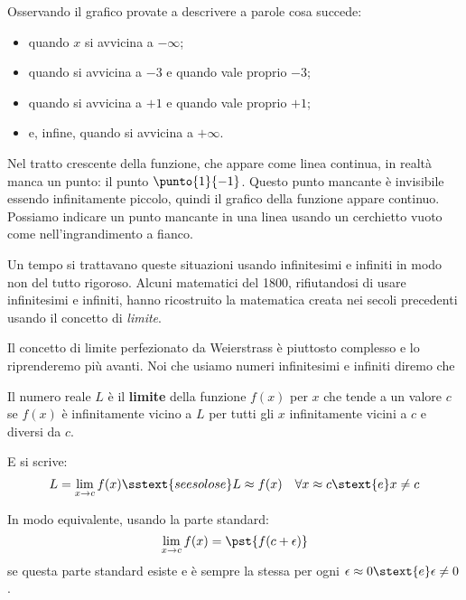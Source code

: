 Osservando il grafico provate a descrivere a parole cosa succede:

\begin{minipage}{.64\textwidth}
\begin{itemize} [nosep]
 \item quando \(x\) si avvicina a \(-\infty\); 
 \item quando si avvicina a \(-3\) e quando vale proprio \(-3\);
 \item quando si avvicina a \(+1\) e quando vale proprio \(+1\); 
 \item e, infine, quando si avvicina a \(+\infty\).
\end{itemize}

\begin{osservazione}
Nel tratto crescente della funzione, che appare come linea continua, in 
realtà manca un punto: il punto \(\punto{1}{-1}\). 
Questo punto mancante è invisibile essendo infinitamente piccolo, quindi il 
grafico della funzione appare continuo. 
Possiamo indicare un punto mancante in una linea usando un cerchietto vuoto 
come nell'ingrandimento a fianco.
\end{osservazione}

\end{minipage}
\hfill
\begin{minipage}{.34\textwidth}
\begin{center}\scalebox{1.2}{\limitigraficob}\end{center}
\end{minipage}

\vspace{1em}
Un tempo si trattavano queste situazioni usando infinitesimi e infiniti in 
modo non del tutto rigoroso.
Alcuni matematici del 1800, rifiutandosi di usare infinitesimi e infiniti, 
hanno ricostruito la matematica creata nei secoli precedenti usando il 
concetto di
\emph{limite}.

Il concetto di limite perfezionato da Weierstrass è piuttosto complesso e lo 
riprenderemo più avanti.
Noi che usiamo numeri infinitesimi e infiniti diremo che

\begin{definizione}
Il numero reale \(L\) è il \textbf{limite} della funzione \(f(x)\) 
per \(x\) che tende a un valore \(c\) se \(f(x)\) è infinitamente vicino a 
\(L\) per tutti gli \(x\) infinitamente vicini a \(c\) e diversi da \(c\).

E si scrive:
\[L = \lim_{x \rightarrow c} f(x) \sstext{se e solo se} 
L \approx {f(x)} \quad 
\forall x \approx c \stext{ e } x \neq c\]

In modo equivalente, usando la parte standard: 
\[\lim_{x \to c} f(x) = \pst{f(c+\epsilon)}\]
se questa parte standard esiste e è sempre la stessa 
per ogni \(\epsilon \approx 0 \stext{ e } \epsilon \neq 0\).
\end{definizione}

